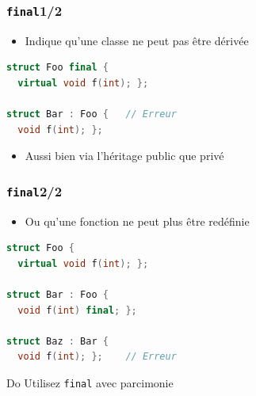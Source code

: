 \documentclass[C++.tex]{subfiles}
\begin{document}
\begin{frame}[fragile]
	\frametitle{\lstinline|final|\titlehfill{}1/2}
	\begin{itemize}
		\item Indique qu'une classe ne peut pas être dérivée
	\end{itemize}

	\begin{lstlisting}[language=C++]
struct Foo final {
  virtual void f(int); };

struct Bar : Foo {   // Erreur
  void f(int); };
\end{lstlisting}

	\begin{itemize}
		\item Aussi bien via l'héritage public que privé
	\end{itemize}
\end{frame}

\begin{frame}[fragile]
	\frametitle{\lstinline|final|\titlehfill{}2/2}
	\begin{itemize}
		\item Ou qu'une fonction ne peut plus être redéfinie
	\end{itemize}

	\begin{lstlisting}[language=C++]
struct Foo {
  virtual void f(int); };

struct Bar : Foo {
  void f(int) final; };

struct Baz : Bar {
  void f(int); };    // Erreur\end{lstlisting}

	\begin{exampleblock}{Do}
		Utilisez \lstinline|final| avec parcimonie

	\end{exampleblock}
\end{frame}
\end{document}
